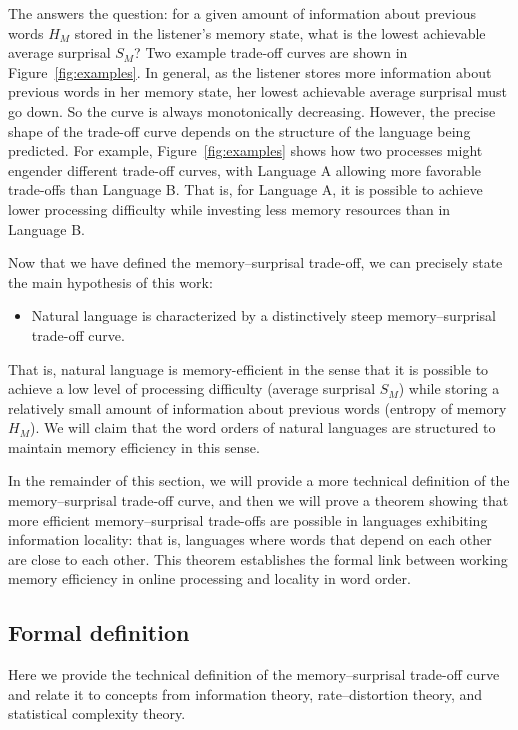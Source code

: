 The  answers the question: for a given amount of information about previous words $H_M$ stored in the listener's memory state, what is the lowest achievable average surprisal $S_M$? Two example trade-off curves are shown in Figure~\ref{fig:examples}. In general, as the listener stores more information about previous words in her memory state, her lowest achievable average surprisal must go down. So the curve is always monotonically decreasing. However, the precise shape of the trade-off curve depends on the structure of the language being predicted. For example, Figure~\ref{fig:examples} shows how two processes might engender different trade-off curves, with Language A allowing more favorable trade-offs than Language B. That is, for Language A, it is possible to achieve lower processing difficulty while investing less memory resources than in Language B.

Now that we have defined the memory--surprisal trade-off, we can precisely state the main hypothesis of this work:
\begin{itemize}
    \item {} Natural language is characterized by a distinctively steep memory--surprisal trade-off curve.
\end{itemize}
That is, natural language is memory-efficient in the sense that it is possible to achieve a low level of processing difficulty (average surprisal $S_M$) while storing a relatively small amount of information about previous words (entropy of memory $H_M$). We will claim that the word orders of natural languages are structured to maintain memory efficiency in this sense.

In the remainder of this section, we will provide a more technical definition of the memory--surprisal trade-off curve, and then we will prove a theorem showing that more efficient memory--surprisal trade-offs are possible in languages exhibiting information locality: that is, languages where words that depend on each other are close to each other. This theorem establishes the formal link between working memory efficiency in online processing and locality in word order.

\subsection{Formal definition}

Here we provide the technical definition of the memory--surprisal trade-off curve and relate it to concepts from information theory, rate--distortion theory, and statistical complexity theory. 

